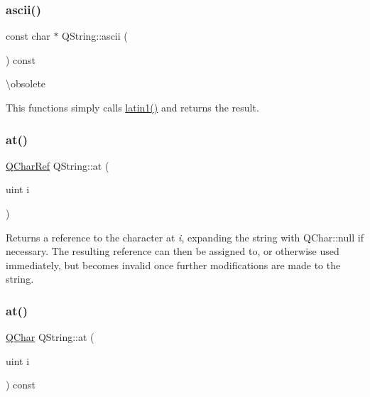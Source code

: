 \subsubsection{\texorpdfstring{ascii()}{ascii()}}
{\footnotesize\ttfamily const char $\ast$ Q\+String\+::ascii (\begin{DoxyParamCaption}{ }\end{DoxyParamCaption}) const}

\textbackslash{}obsolete

This functions simply calls \mbox{\hyperlink{class_q_string_af9cb186d8ba117c42f31e8235478fe68}{latin1()}} and returns the result. \mbox{\label{class_q_string_a36f6c3019eb2c130513c0bbb6ec8ac35}} 
\subsubsection{\texorpdfstring{at()}{at()}\hspace{0.1cm}{\footnotesize\ttfamily [1/2]}}
{\footnotesize\ttfamily \mbox{\hyperlink{class_q_char_ref}{Q\+Char\+Ref}} Q\+String\+::at (\begin{DoxyParamCaption}\item[{uint}]{i }\end{DoxyParamCaption})\hspace{0.3cm}{\ttfamily [inline]}}

Returns a reference to the character at {\itshape i}, expanding the string with Q\+Char\+::null if necessary. The resulting reference can then be assigned to, or otherwise used immediately, but becomes invalid once further modifications are made to the string. \mbox{\label{class_q_string_a5e35837892a410c0396af0cb5cd4a517}} 
\subsubsection{\texorpdfstring{at()}{at()}\hspace{0.1cm}{\footnotesize\ttfamily [2/2]}}
{\footnotesize\ttfamily \mbox{\hyperlink{class_q_char}{Q\+Char}} Q\+String\+::at (\begin{DoxyParamCaption}\item[{uint}]{i }\end{DoxyParamCaption}) const\hspace{0.3cm}{\ttfamily [inline]}}

